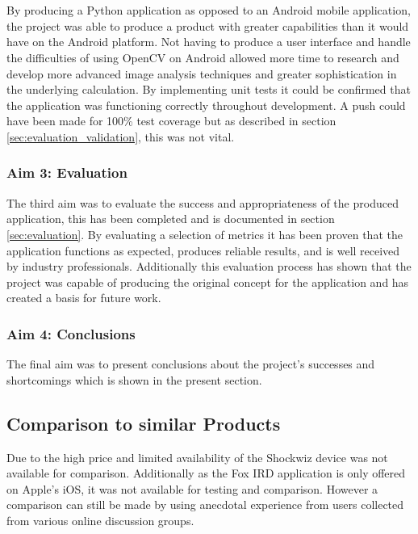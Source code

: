 			\\\\
			By producing a Python application as opposed to an Android mobile application, the project was able to produce a product with greater capabilities than it would have on the Android platform. Not having to produce a user interface and handle the difficulties of using OpenCV on Android allowed more time to research and develop more advanced image analysis techniques and greater sophistication in the underlying calculation. By implementing unit tests it could be confirmed that the application was functioning correctly throughout development. A push could have been made for 100\% test coverage but as described in section \ref{sec:evaluation_validation}, this was not vital.
		\subsubsection{Aim 3: Evaluation}
			The third aim was to evaluate the success and appropriateness of the produced application, this has been completed and is documented in section \ref{sec:evaluation}. By evaluating a selection of metrics it has been proven that the application functions as expected, produces reliable results, and is well received by industry professionals. Additionally this evaluation process has shown that the project was capable of producing the original concept for the application and has created a basis for future work.
		\subsubsection{Aim 4: Conclusions}
			The final aim was to present conclusions about the project's successes and shortcomings which is shown in the present section.
	\subsection{Comparison to similar Products}
		Due to the high price and limited availability of the Shockwiz device was not available for comparison. Additionally as the Fox IRD application is only offered on Apple's iOS, it was not available for testing and comparison. However a comparison can still be made by using anecdotal experience from users collected from various online discussion groups.
